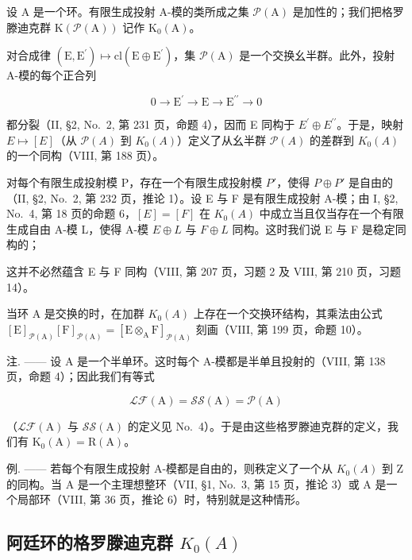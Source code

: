 设 \(\mathrm{A}\) 是一个环。有限生成投射 A-模的类所成之集 \(\mathcal{P}(\mathrm{A})\) 是加性的；我们把格罗滕迪克群 \(\mathrm{K}(\mathcal{P}(\mathrm{A}))\) 记作 \(\mathrm{K}_0(\mathrm{A})\)。

对合成律 \((\mathrm{E},\mathrm{E}^{\prime})\mapsto\mathrm{cl}(\mathrm{E}\oplus\mathrm{E}^{\prime})\)，集 \(\mathcal{P}(\mathrm{A})\) 是一个交换幺半群。此外，投射 A-模的每个正合列

\[
0 \longrightarrow \mathrm{E} ^ {\prime} \longrightarrow \mathrm{E} \longrightarrow \mathrm{E} ^ {\prime \prime} \longrightarrow 0
\]

都分裂（II, §2, No.~2, 第 231 页，命题 4），因而 E 同构于 \(E^{\prime} \oplus E^{\prime\prime}\)。于是，映射 \(E \mapsto [E]\)（从 \(\mathcal{P}(A)\) 到 \(K_{0}(A)\)）定义了从幺半群 \(\mathcal{P}(A)\) 的差群到 \(K_{0}(A)\) 的一个同构（VIII, 第 188 页）。

对每个有限生成投射模 P，存在一个有限生成投射模 \(P'\)，使得 \(P \oplus P'\) 是自由的（II, §2, No.~2, 第 232 页，推论 1）。设 E 与 F 是有限生成投射 A-模；由 I, §2, No.~4, 第 18 页的命题 6，\([E] = [F]\) 在 \(K_{0}(A)\) 中成立当且仅当存在一个有限生成自由 A-模 L，使得 A-模 \(E \oplus L\) 与 \(F \oplus L\) 同构。这时我们说 E 与 F 是稳定同构的；

这并不必然蕴含 E 与 F 同构（VIII, 第 207 页，习题 2 及 VIII, 第 210 页，习题 14）。

当环 A 是交换的时，在加群 \(K_{0}(A)\) 上存在一个交换环结构，其乘法由公式 \([\mathrm{E}]_{\mathcal{P}(\mathrm{A})}[\mathrm{F}]_{\mathcal{P}(\mathrm{A})} = [\mathrm{E} \otimes_{\mathrm{A}} \mathrm{F}]_{\mathcal{P}(\mathrm{A})}\) 刻画（VIII, 第 199 页，命题 10）。

注. —— 设 A 是一个半单环。这时每个 A-模都是半单且投射的（VIII, 第 138 页，命题 4）；因此我们有等式

\[
\mathscr {L} \mathscr {F} (\mathrm{A}) = \mathscr {S S} (\mathrm{A}) = \mathscr {P} (\mathrm{A})
\]

（\(\mathcal{LF}(\mathrm{A})\) 与 \(\mathcal{SS}(\mathrm{A})\) 的定义见 No.~4）。于是由这些格罗滕迪克群的定义，我们有 \(\mathrm{K}_0(\mathrm{A}) = \mathrm{R}(\mathrm{A})\)。

例. —— 若每个有限生成投射 A-模都是自由的，则秩定义了一个从 \(K_{0}(A)\) 到 Z 的同构。当 A 是一个主理想整环（VII, §1, No.~3, 第 15 页，推论 3）或 A 是一个局部环（VIII, 第 36 页，推论 6）时，特别就是这种情形。

\subsection{\texorpdfstring{阿廷环的格罗滕迪克群 \(K_{0}(A)\)}{阿廷环的格罗滕迪克群 K\_\{0\}(A)}}

